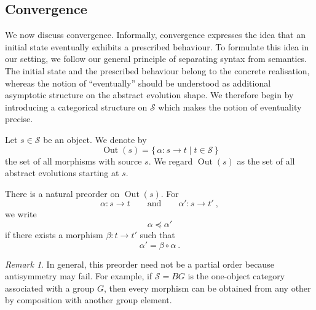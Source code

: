 \documentclass[a4paper,reqno,oneside]{amsart}
\theoremstyle{definition}
\theoremstyle{remark}
\newtheorem{remark}[theorem]{Remark}
\numberwithin{equation}{section}
\begin{document}
	
	\subsection{Convergence}
	
	We now discuss convergence. Informally, convergence expresses the idea that
	an initial state eventually exhibits a prescribed behaviour. To formulate
	this idea in our setting, we follow our general principle of separating
	syntax from semantics. The initial state and the prescribed behaviour belong
	to the concrete realisation, whereas the notion of ``eventually'' should be
	understood as additional asymptotic structure on the abstract evolution
	shape. We therefore begin by introducing a categorical structure on
	$\mathcal S$ which makes the notion of eventuality precise.
	
	\medskip
	
	Let $s\in\mathcal S$ be an object. We denote by
	\begin{equation}
		\operatorname{Out}(s)
		=
		\{\,\alpha\colon s\to t \mid t\in\mathcal S\,\}
	\end{equation}
	the set of all morphisms with source $s$. We regard $\operatorname{Out}(s)$ as the set of all abstract evolutions starting at $s$.
	
	There is a natural preorder on $\operatorname{Out}(s)$. For
	\begin{equation}
		\alpha\colon s\to t
		\qquad
		\text{and}
		\qquad
		\alpha'\colon s\to t' \ ,
	\end{equation}
	we write
	\begin{equation}
		\alpha\preceq \alpha'
	\end{equation}
	if there exists a morphism $ \beta\colon t\to t'$ such that
	\begin{equation}
		\alpha'=\beta\circ\alpha \ .
	\end{equation}
	
	\begin{remark}
		In general, this preorder need not be a partial order because antisymmetry may fail. For example, if $\mathcal S=BG$ is the one-object category associated with a group $G$, then every morphism can be obtained from any other by composition with another
		group element.
	\end{remark}
	
	
	
\end{document}
